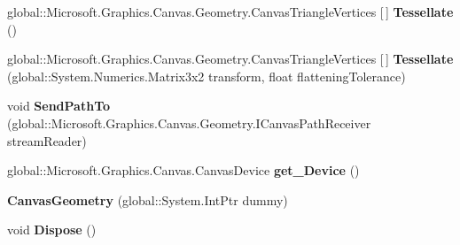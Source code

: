 \begin{DoxyCompactItemize}
\item 
\mbox{\label{class_microsoft_1_1_graphics_1_1_canvas_1_1_geometry_1_1_canvas_geometry_a0a66062ad10deeea0d4c354fa37dd1e5}} 
global\+::\+Microsoft.\+Graphics.\+Canvas.\+Geometry.\+Canvas\+Triangle\+Vertices \mbox{[}$\,$\mbox{]} {\bfseries Tessellate} ()
\item 
\mbox{\label{class_microsoft_1_1_graphics_1_1_canvas_1_1_geometry_1_1_canvas_geometry_ad81e27003f60c585c31cd07e1bd2a92a}} 
global\+::\+Microsoft.\+Graphics.\+Canvas.\+Geometry.\+Canvas\+Triangle\+Vertices \mbox{[}$\,$\mbox{]} {\bfseries Tessellate} (global\+::\+System.\+Numerics.\+Matrix3x2 transform, float flattening\+Tolerance)
\item 
\mbox{\label{class_microsoft_1_1_graphics_1_1_canvas_1_1_geometry_1_1_canvas_geometry_ac6b1c589bbbc82f3130c0f1164401983}} 
void {\bfseries Send\+Path\+To} (global\+::\+Microsoft.\+Graphics.\+Canvas.\+Geometry.\+I\+Canvas\+Path\+Receiver stream\+Reader)
\item 
\mbox{\label{class_microsoft_1_1_graphics_1_1_canvas_1_1_geometry_1_1_canvas_geometry_a5c318bc4d58999fcf66c9bafd45ffe8b}} 
global\+::\+Microsoft.\+Graphics.\+Canvas.\+Canvas\+Device {\bfseries get\+\_\+\+Device} ()
\item 
\mbox{\label{class_microsoft_1_1_graphics_1_1_canvas_1_1_geometry_1_1_canvas_geometry_aa2808482bc01ed6dfc625b6e9d3ef3ca}} 
{\bfseries Canvas\+Geometry} (global\+::\+System.\+Int\+Ptr dummy)
\item 
\mbox{\label{class_microsoft_1_1_graphics_1_1_canvas_1_1_geometry_1_1_canvas_geometry_a6173265c5e6f97788ac9715a18ee8b03}} 
void {\bfseries Dispose} ()
\item 
\mbox{\label{class_microsoft_1_1_graphics_1_1_canvas_1_1_geometry_1_1_canvas_geometry_aaf62c4106c1df76395cb0e89a2663f79}} 

\end{DoxyCompactItemize}
